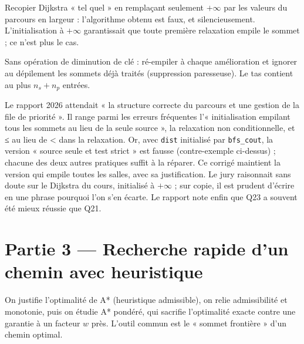 \documentclass[11pt,a4paper]{article}
\begin{document}
\begin{piege}

Recopier Dijkstra « tel quel » en remplaçant seulement \(+\infty\) par les valeurs du parcours en largeur : l'algorithme obtenu est faux, et silencieusement. L'initialisation à \(+\infty\) garantissait que toute première relaxation empile le sommet ; ce n'est plus le cas.

\end{piege}

\begin{methode}

Sans opération de diminution de clé : ré-empiler à chaque amélioration et ignorer au dépilement les sommets déjà traités (suppression paresseuse). Le tas contient au plus \(n_s + n_p\) entrées.

\end{methode}

\begin{jury}

Le rapport 2026 attendait « la structure correcte du parcours et une gestion de la file de priorité ». Il range parmi les erreurs fréquentes l'« initialisation empilant tous les sommets au lieu de la seule source », la relaxation non conditionnelle, et ≤ au lieu de \textless{} dans la relaxation. Or, avec \texttt{dist} initialisé par \texttt{bfs\_cout}, la version « source seule et test strict » est fausse (contre-exemple ci-dessus) ; chacune des deux autres pratiques suffit à la réparer. Ce corrigé maintient la version qui empile toutes les salles, avec sa justification. Le jury raisonnait sans doute sur le Dijkstra du cours, initialisé à \(+\infty\) ; sur copie, il est prudent d'écrire en une phrase pourquoi l'on s'en écarte. Le rapport note enfin que Q23 a souvent été mieux réussie que Q21.

\end{jury}

\hypertarget{partie-3-recherche-rapide-dun-chemin-avec-heuristique}{%
\section{Partie 3 --- Recherche rapide d'un chemin avec heuristique}\label{partie-3-recherche-rapide-dun-chemin-avec-heuristique}}

On justifie l'optimalité de A* (heuristique admissible), on relie admissibilité et monotonie, puis on étudie A* pondéré, qui sacrifie l'optimalité exacte contre une garantie à un facteur \(w\) près. L'outil commun est le « sommet frontière » d'un chemin optimal.
\end{document}
